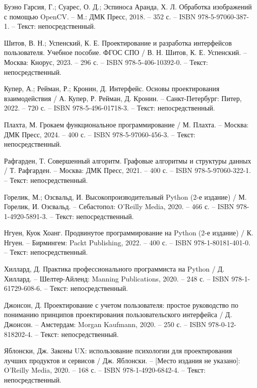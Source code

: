 \begin{thebibliography}{9}
     Буэно Гарсия, Г.; Суарес, О. Д.; Эспиноса Аранда, Х. Л. Обработка изображений с помощью OpenCV. – М.: ДМК Пресс, 2018. – 352 с. – ISBN 978-5-97060-387-1. – Текст: непосредственный.
    
     Шитов, В. Н.; Успенский, К. Е. Проектирование и разработка интерфейсов пользователя. Учебное пособие. ФГОС СПО / В. Н. Шитов, К. Е. Успенский. – Москва: Кнорус, 2023. – 296 с. – ISBN 978-5-406-10392-0. – Текст: непосредственный.
    
     Купер, А.; Рейман, Р.; Кронин, Д. Интерфейс. Основы проектирования взаимодействия / А. Купер, Р. Рейман, Д. Кронин. – Санкт-Петербург: Питер, 2022. – 720 с. – ISBN 978-5-496-01718-3. – Текст: непосредственный.
    
     Плахта, М. Грокаем функциональное программирование / М. Плахта. – Москва: ДМК Пресс, 2024. – 400 с. – ISBN 978-5-97060-456-3. – Текст: непосредственный.
    
     Рафгарден, Т. Совершенный алгоритм. Графовые алгоритмы и структуры данных / Т. Рафгарден. – Москва: ДМК Пресс, 2021. – 400 с. – ISBN 978-5-97060-322-1. – Текст: непосредственный.
    
     Горелик, М.; Озсвальд, И. Высокопроизводительный Python (2-е издание) / М. Горелик, И. Озсвальд. – Себастопол: O’Reilly Media, 2020. – 466 с. – ISBN 978-1-4920-5891-3. – Текст: непосредственный.
    
     Нгуен, Куок Хоанг. Продвинутое программирование на Python (2-е издание) / К. Нгуен. – Бирмингем: Packt Publishing, 2022. – 400 с. – ISBN 978-1-80181-401-0. – Текст: непосредственный.
    
     Хиллард, Д. Практика профессионального программиста на Python / Д. Хиллард. – Шелтер-Айленд: Manning Publications, 2020. – 248 с. – ISBN 978-1-61729-608-6. – Текст: непосредственный.
    
     Джонсон, Д. Проектирование с учетом пользователя: простое руководство по пониманию принципов проектирования пользовательского интерфейса / Д. Джонсон. – Амстердам: Morgan Kaufmann, 2020. – 250 с. – ISBN 978-0-12-818202-4. – Текст: непосредственный.
    
     Яблонски, Дж. Законы UX: использование психологии для проектирования лучших продуктов и сервисов / Дж. Яблонски. – [Место издания не указано]: O’Reilly Media, 2020. – 168 с. – ISBN 978-1-4920-6842-4. – Текст: непосредственный.
    

\end{thebibliography}
